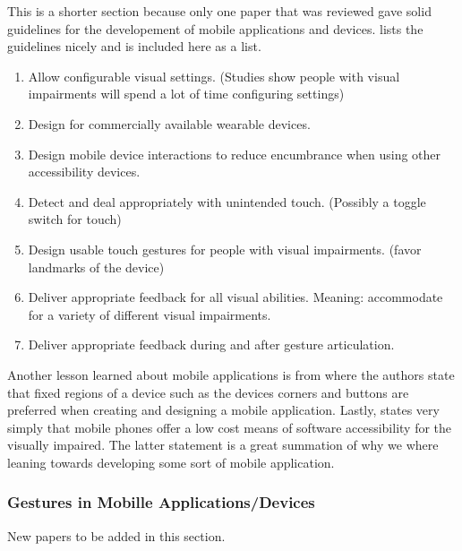 \documentclass{article}
\begin{document}
\par This is a shorter section because only one paper that was reviewed gave solid guidelines for the developement of mobile applications and devices. \cite{doi:10.1080/10447318.2017.1279827} lists the guidelines nicely and is included here as a list.
\begin{enumerate}
    \item Allow configurable visual settings. (Studies show people with visual impairments will spend a lot of time configuring settings) 
    \item Design for commercially available wearable devices. 
    \item Design mobile device interactions to reduce encumbrance when using other accessibility devices.
    \item Detect and deal appropriately with unintended touch. (Possibly a toggle switch for touch) 
    \item Design usable touch gestures for people with visual impairments. (favor landmarks of the device)
    \item Deliver appropriate feedback for all visual abilities. Meaning: accommodate for a variety of different visual impairments.
    \item Deliver appropriate feedback during and after gesture articulation.
\end{enumerate}
Another lesson learned about mobile applications is from \cite{RODRIGUEZSANCHEZ20147210} where the authors state that fixed regions of a device such as the devices corners and buttons are preferred when creating and designing a mobile application. Lastly, \cite{bandyopadhyay2017sound} states very simply that mobile phones offer a low cost means of software accessibility for the visually impaired. The latter statement is a great summation of why we where leaning towards developing some sort of mobile application.


\subsubsection{Gestures in Mobille Applications/Devices}

\par {\color{magenta} New papers to be added in this section. }
\end{document}
